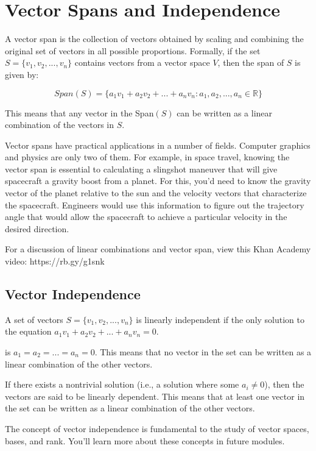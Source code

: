 \chapter{Vector Spans and Independence}

A vector span is the collection of vectors obtained by scaling and combining the original set of vectors in all possible proportions.  Formally, if the set $S = \{v_1, v_2, ..., v_n\}$ contains vectors from a vector space $V$, then the span of $S$ is given by:

\begin{equation}
{Span}(S) = \{a_1v_1 + a_2v_2 + ... + a_nv_n : a_1, a_2, ..., a_n \in \mathbb{R}\}
\end{equation}

This means that any vector in the Span$(S)$ can be written as a linear combination of the vectors in $S$.

Vector spans have practical applications in a number of fields. Computer graphics and physics are only two of them. For example, in space travel, knowing the vector span is essential to calculating a slingshot maneuver that will give spacecraft a gravity boost from a planet. For this, you'd need to know the gravity vector of the planet relative to the sun and the velocity vectors that characterize the spacecraft. Engineers would use this information to figure out the trajectory angle that would allow the spacecraft to achieve a particular velocity in the desired direction. 

For a discussion of linear combinations and vector span, view this Khan Academy video: https://rb.gy/g1snk

\section{Vector Independence}
A set of vectors $S = \{v_1, v_2, ..., v_n\}$ is  linearly independent if the only solution to the equation $a_1v_1 + a_2v_2 + ... + a_nv_n = 0$.

is $a_1 = a_2 = ... = a_n = 0$. This means that no vector in the set can be written as a linear combination of the other vectors.

If there exists a nontrivial solution (i.e., a solution where some $a_i \neq 0$), then the vectors are said to be linearly dependent. This means that at least one vector in the set can be written as a linear combination of the other vectors.

The concept of vector independence is fundamental to the study of vector spaces, bases, and rank. You'll learn more about these concepts in future modules. 

